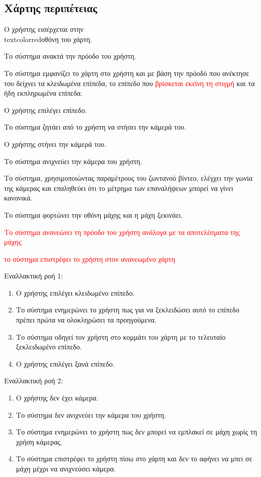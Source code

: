 \newpage
\subsection{Χάρτης περιπέτειας}
\label{sec:map}
\begin{enumerate}
    \item Ο χρήστης εισέρχεται στην \\textcolor{red}{οθόνη του χάρτη.}
    \item Το σύστημα ανακτά την πρόοδο του χρήστη.
    \item Το σύστημα εμφανίζει το χάρτη στο χρήστη και με βάση την πρόοδό που ανέκτησε του δείχνει τα κλειδωμένα επίπεδα, το επίπεδο που \textcolor{red}{βρίσκεται εκείνη τη στιγμή} και τα ήδη εκπληρωμένα επίπεδα. 
    \item Ο χρήστης επιλέγει επίπεδο.
    \item Το σύστημα ζητάει από το χρήστη να στήσει την κάμερά του.
    \item Ο χρήστης στήνει την κάμερά του.
    \item Το σύστημα ανιχνεύει την κάμερα του χρήστη. 
    \item Το σύστημα, χρησιμοποιώντας παραμέτρους του ζωντανού βίντεο, ελέγχει την γωνία της κάμερας και επαληθεύει ότι το μέτρημα των επαναλήψεων μπορεί να γίνει κανονικά.
    \item Το σύστημα φορτώνει την οθόνη μάχης και η μάχη ξεκινάει.
    \textcolor{red} {
    \item Το σύστημα ανανεώνει τη πρόοδο του χρήστη ανάλογα με τα αποτελέσματα της μάχης 
    \item το σύστημα επιστρέφει το χρήστη στον ανανεωμένο χάρτη
    }
\end{enumerate}


Εναλλακτική ροή 1: 
\begin{enumerate}[label=4.\alph*.,ref=4.\alph*]
\item Ο χρήστης επιλέγει κλειδωμένο επίπεδο.
\item Το σύστημα ενημερώνει το χρήστη πως για να ξεκλειδώσει αυτό το επίπεδο πρέπει πρώτα να ολοκληρώσει τα προηγούμενα.
\item Το σύστημα οδηγεί τον χρήστη στο κομμάτι του χάρτη με το τελευταίο ξεκλειδωμένο επίπεδο.
\item Ο χρήστης επιλέγει ξανά επίπεδο.
\end{enumerate}


Εναλλακτική ροή 2:
\begin{enumerate}[label=6.\alph*.,ref=6.\alph*]
\item Ο χρήστης δεν έχει κάμερα.
\item Το σύστημα δεν ανιχνεύει την κάμερα του χρήστη.
\item Το σύστημα ενημερώνει το χρήστη πως δεν μπορεί να εμπλακεί σε μάχη χωρίς τη χρήση κάμερας.
\item Το σύστημα επιστρέφει το χρήστη πίσω στο χάρτη και δεν το αφήνει να μπει σε μάχη μέχρι να ανιχνεύσει κάμερα.
\end{enumerate}

